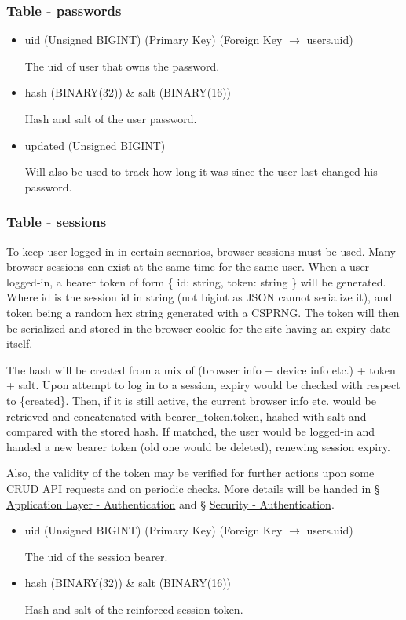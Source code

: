 \documentclass[12pt]{report}
\newcommand{\n}{\par}
\begin{document}
\subsubsection{Table - passwords} \label{data-layer.design.user-system.passwords}
\begin{itemize}
	\item uid (Unsigned BIGINT) (Primary Key) (Foreign Key $\rightarrow$ users.uid)\n
	      The uid of user that owns the password.
	\item hash (BINARY(32)) \& salt (BINARY(16))\n
	      Hash and salt of the user password.
	\item updated (Unsigned BIGINT)\n
	      Will also be used to track how long it was since the user last changed his password.
\end{itemize}

\subsubsection{Table - sessions} \label{data-layer.design.user-system.sessions}
To keep user logged-in in certain scenarios, browser sessions must be used.
Many browser sessions can exist at the same time for the same user.
When a user logged-in, a bearer token of form
\{ id: string, token: string \}
will be generated.
Where id is the session id in string (not bigint as JSON cannot serialize it), and
token being a random hex string generated with a CSPRNG.
The token will then be serialized and stored in the browser cookie for the site having an expiry date itself.\n
The hash will be created from a mix of (browser info + device info etc.) + token + salt.
Upon attempt to log in to a session,
expiry would be checked with respect to \{created\}.
Then, if it is still active, the current browser info etc. would be retrieved and concatenated with bearer\_token.token,
hashed with salt and compared with the stored hash.
If matched, the user would be logged-in and handed a new bearer token (old one would be deleted), renewing session expiry.\n
Also, the validity of the token may be verified for further actions upon some CRUD API requests and on periodic checks.
More details will be handed in \S{} \hyperref[application-layer.implementation.authentication]{Application Layer - Authentication} and
\S{} \hyperref[security.authentication]{Security - Authentication}.
\begin{itemize}
	\item uid (Unsigned BIGINT) (Primary Key) (Foreign Key $\rightarrow$ users.uid)\n
	      The uid of the session bearer.
	\item hash (BINARY(32)) \& salt (BINARY(16))\n
	      Hash and salt of the reinforced session token.
\end{itemize}
\end{document}

